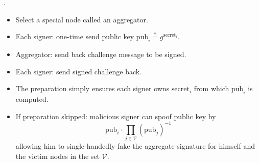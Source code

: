 \begin{frame}
.
\begin{emptyTheorem}
\begin{itemize}
\item<2-> Select a special node called an aggregator.
\item<3-> Each signer: one-time send public key $\mathrm{pub}_i \stackrel{?}{=} g^{\mathrm{secret}_i}$.
\item<4-> Aggregator: send back challenge message to be signed.
\item<5-> Each signer: send signed challenge back.
\end{itemize}
\end{emptyTheorem}

\begin{itemize}
\item<6-> The preparation simply ensures each signer owns $\mathrm{secret}_i$ from which $\mathrm{pub}_i $ is computed. 
\item<7-> If preparation skipped: malicious signer can spoof public key by 
\[
\mathrm{pub}_i \cdot \prod_{j \in \mathcal V} \left(\mathrm{pub}_j \right)^{-1} 
\] 
allowing him to single-handedly fake the aggregate signature for himself and the victim nodes in the set $\mathcal V$. 
\end{itemize}
\vskip 15cm

\end{frame}

